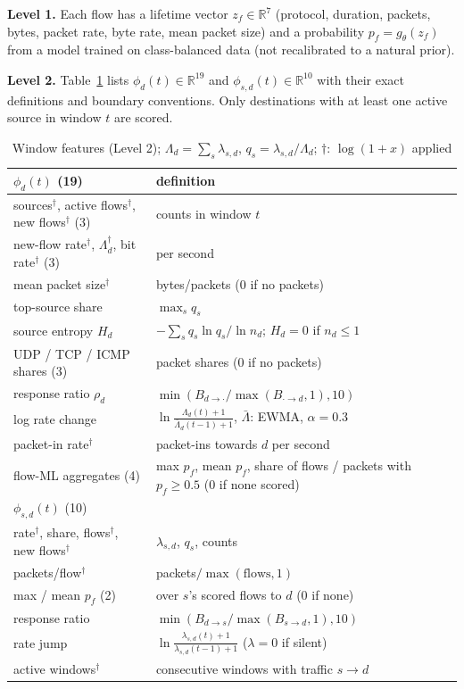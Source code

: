 \documentclass[conference]{IEEEtran}
\begin{document}
\textbf{Level 1.} Each flow has a lifetime vector $z_f\in\mathbb{R}^7$ (protocol, duration, packets, bytes, packet rate, byte rate, mean packet size) and a probability $p_f=g_\theta(z_f)$ from a model trained on class-balanced data (not recalibrated to a natural prior).

\textbf{Level 2.} Table~\ref{tab:feat} lists $\phi_d(t)\in\mathbb{R}^{19}$ and $\phi_{s,d}(t)\in\mathbb{R}^{10}$ with their exact definitions and boundary conventions. Only destinations with at least one active source in window $t$ are scored.

\begin{table}[t]
\caption{Window features (Level 2); $\Lambda_d=\sum_s\lambda_{s,d}$, $q_s=\lambda_{s,d}/\Lambda_d$; $\dagger$: $\log(1+x)$ applied}
\label{tab:feat}
\centering
\footnotesize
\setlength{\tabcolsep}{2.5pt}
\begin{tabular}{p{}p{}}
\toprule
$\phi_d(t)$ (19) & definition \\
\midrule
sources$^\dagger$, active flows$^\dagger$, new flows$^\dagger$ (3) & counts in window $t$ \\
new-flow rate$^\dagger$, $\Lambda_d^\dagger$, bit rate$^\dagger$ (3) & per second \\
mean packet size$^\dagger$ & bytes/packets (0 if no packets) \\
top-source share & $\max_s q_s$ \\
source entropy $H_d$ & $-\sum_s q_s\ln q_s/\ln n_d$; $H_d=0$ if $n_d\le1$ \\
UDP / TCP / ICMP shares (3) & packet shares (0 if no packets) \\
response ratio $\rho_d$ & $\min(B_{d\to\cdot}/\max(B_{\cdot\to d},1),10)$ \\
log rate change & $\ln\frac{\Lambda_d(t)+1}{\bar\Lambda_d(t-1)+1}$, $\bar\Lambda$: EWMA, $\alpha=0.3$ \\
packet-in rate$^\dagger$ & packet-ins towards $d$ per second \\
flow-ML aggregates (4) & max $p_f$, mean $p_f$, share of flows / packets with $p_f\ge0.5$ (0 if none scored) \\
\midrule
$\phi_{s,d}(t)$ (10) & \\
\midrule
rate$^\dagger$, share, flows$^\dagger$, new flows$^\dagger$ & $\lambda_{s,d}$, $q_s$, counts \\
packets/flow$^\dagger$ & packets$/\max(\text{flows},1)$ \\
max / mean $p_f$ (2) & over $s$'s scored flows to $d$ (0 if none) \\
response ratio & $\min(B_{d\to s}/\max(B_{s\to d},1),10)$ \\
rate jump & $\ln\frac{\lambda_{s,d}(t)+1}{\lambda_{s,d}(t-1)+1}$ ($\lambda=0$ if silent) \\
active windows$^\dagger$ & consecutive windows with traffic $s\to d$ \\
\bottomrule
\end{tabular}
\end{table}
\end{document}
